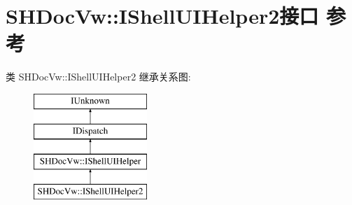 \hypertarget{interface_s_h_doc_vw_1_1_i_shell_u_i_helper2}{}\section{S\+H\+Doc\+Vw\+:\+:I\+Shell\+U\+I\+Helper2接口 参考}
\label{interface_s_h_doc_vw_1_1_i_shell_u_i_helper2}
类 S\+H\+Doc\+Vw\+:\+:I\+Shell\+U\+I\+Helper2 继承关系图\+:\begin{figure}[H]
\begin{center}
\leavevmode
\includegraphics[height=4.000000cm]{interface_s_h_doc_vw_1_1_i_shell_u_i_helper2}
\end{center}
\end{figure}
